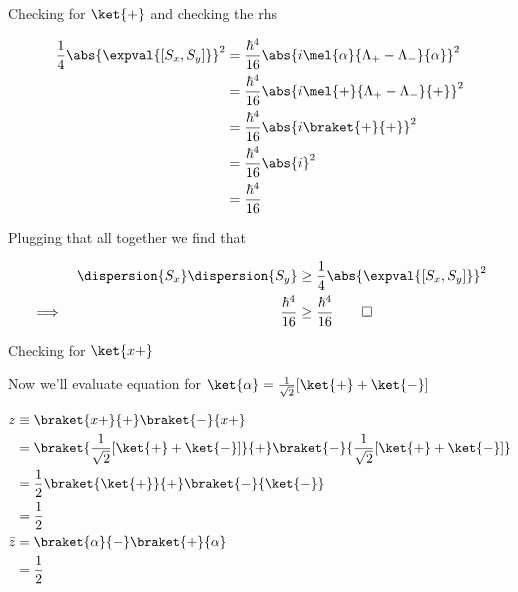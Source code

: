 \begin{answer}
\begin{answerpart}{Checking for \texorpdfstring{$\ket{+}$}{|+>}}
    and checking the \ac{rhs}

    \begin{equation}
      \begin{split}
        \frac{1}{4}\abs{\expval{[S_x, S_y]}}^2
        &=
        \frac{\hbar^4}{16}
        \abs{i\mel{\alpha}{\Lambda_+ - \Lambda_-}{\alpha}}^2\\
        &=
        \frac{\hbar^4}{16}
        \abs{i\mel{+}{\Lambda_+ - \Lambda_-}{+}}^2\\
        &=
        \frac{\hbar^4}{16}
        \abs{i\braket{+}{+}}^2\\
        &=
        \frac{\hbar^4}{16}
        \abs{i}^2\\
        &=
        \frac{\hbar^4}{16}\\
      \end{split}
    \end{equation}

    Plugging that all together we find that

    \begin{equation}
      \begin{alignedat}{2}
        & &
        \dispersion{S_x}\dispersion{S_y}
        &\ge \frac{1}{4}\abs{\expval{[S_x, S_y]}}^2\\
        \implies\quad & &
        \frac{\hbar^4}{16} &\ge \frac{\hbar^4}{16}\qed\\
      \end{alignedat}
    \end{equation}
    
  \end{answerpart}

  \begin{answerpart}{Checking for \texorpdfstring{$\ket{x+}$}{|x+>}}

    Now we'll evaluate equation  for $\ket{\alpha} =
    \frac{1}{\sqrt{2}} [\ket{+} + \ket{-}]$

    \begin{equation}
      \begin{split}
        z &\equiv \braket{x+}{+}\braket{-}{x+}\\
        &=
        \braket{\frac{1}{\sqrt{2}} [\ket{+} + \ket{-}]}{+}
        \braket{-}{\frac{1}{\sqrt{2}} [\ket{+} + \ket{-}]}
        \\
        &=
        \frac{1}{2}
        \braket{\ket{+}}{+}
        \braket{-}{\ket{-}}
        \\
        &=
        \frac{1}{2}
        \\
        \bar{z} &= \braket{\alpha}{-}\braket{+}{\alpha}\\
        &= \frac{1}{2}\\
      \end{split}
    \end{equation}


\end{answerpart}
\end{answer}
